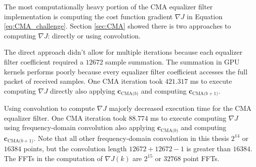 The most computationally heavy portion of the CMA equalizer filter implementation is computing the cost function gradient $\nabla J$ in Equation \eqref{eq:CMA_challenge}.
Section \ref{sec:CMA} showed there is two approaches to computing $\nabla J$: directly or using convolution.

The direct approach didn't allow for multiple iterations because each equalizer filter coefficient required a $12672$ sample summation.
The summation in GPU kernels performs poorly because every equalizer filter coefficient accesses the full packet of received samples.
One CMA iteration took $421.317$ ms to execute computing $\nabla J$ directly also applying $\mathbf{c}_\text{CMA($b$)}$ and computing $\mathbf{c}_\text{CMA($b+1$)}$.

Using convolution to compute $\nabla J$ majorly decreased execution time for the CMA equalizer filter.
One CMA iteration took $88.774$ ms to execute computing $\nabla J$ using frequency-domain convolution also applying $\mathbf{c}_\text{CMA($b$)}$ and computing $\mathbf{c}_\text{CMA($b+1$)}$.
Note that all other frequency-domain convolution in this thesis $2^{14}$ or $16384$ points, but the convolution length $12672+12672-1$ is greater than $16384$. 
The FFTs in the computation of $\nabla J(k)$ are $2^{15}$ or $32768$ point FFTs.

